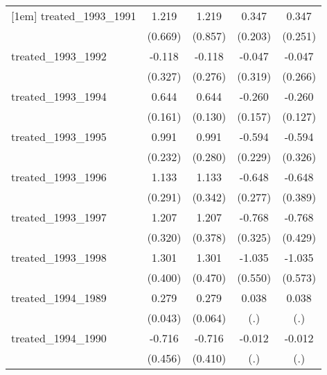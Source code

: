 {\begin{tabular}{l*{4}{c}}
[1em]
treated\_1993\_1991&       1.219         &       1.219         &       0.347         &       0.347         \\
            &     (0.669)         &     (0.857)         &     (0.203)         &     (0.251)         \\
[1em]
treated\_1993\_1992&      -0.118         &      -0.118         &      -0.047         &      -0.047         \\
            &     (0.327)         &     (0.276)         &     (0.319)         &     (0.266)         \\
[1em]
treated\_1993\_1994&       0.644\sym{***}&       0.644\sym{***}&      -0.260         &      -0.260\sym{*}  \\
            &     (0.161)         &     (0.130)         &     (0.157)         &     (0.127)         \\
[1em]
treated\_1993\_1995&       0.991\sym{***}&       0.991\sym{***}&      -0.594\sym{**} &      -0.594         \\
            &     (0.232)         &     (0.280)         &     (0.229)         &     (0.326)         \\
[1em]
treated\_1993\_1996&       1.133\sym{***}&       1.133\sym{***}&      -0.648\sym{*}  &      -0.648         \\
            &     (0.291)         &     (0.342)         &     (0.277)         &     (0.389)         \\
[1em]
treated\_1993\_1997&       1.207\sym{***}&       1.207\sym{**} &      -0.768\sym{*}  &      -0.768         \\
            &     (0.320)         &     (0.378)         &     (0.325)         &     (0.429)         \\
[1em]
treated\_1993\_1998&       1.301\sym{**} &       1.301\sym{**} &      -1.035         &      -1.035         \\
            &     (0.400)         &     (0.470)         &     (0.550)         &     (0.573)         \\
[1em]
treated\_1994\_1989&       0.279\sym{***}&       0.279\sym{***}&       0.038         &       0.038         \\
            &     (0.043)         &     (0.064)         &         (.)         &         (.)         \\
[1em]
treated\_1994\_1990&      -0.716         &      -0.716         &      -0.012         &      -0.012         \\
            &     (0.456)         &     (0.410)         &         (.)         &         (.)         \\

\end{tabular}}
